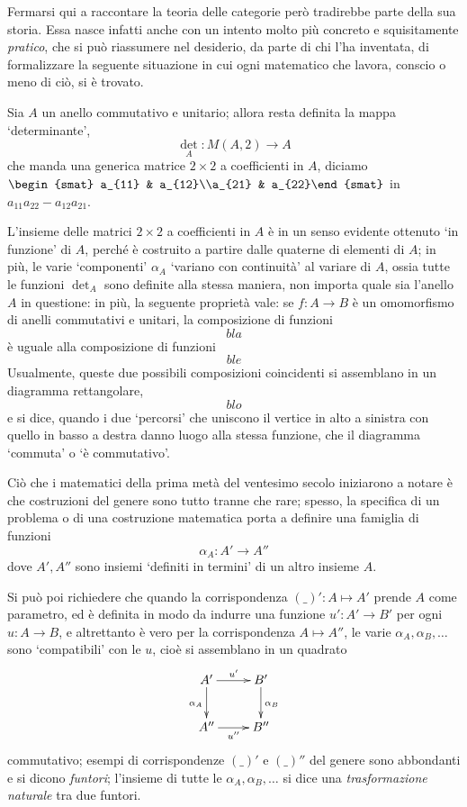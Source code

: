 Fermarsi qui a raccontare la teoria delle categorie però tradirebbe parte della sua storia. Essa nasce infatti anche con un intento molto più concreto e squisitamente \emph{pratico}, che si può riassumere nel desiderio, da parte di chi l'ha inventata, di formalizzare la seguente situazione in cui ogni matematico che lavora, conscio o meno di ciò, si è trovato.
\begin{example}
	Sia \(A\) un anello commutativo e unitario; allora resta definita la mappa `determinante',
	\[\textstyle\det_A : M(A,2) \to A\]
	che manda una generica matrice \(2\times 2\) a coefficienti in \(A\), diciamo \(\begin{smat} a_{11} & a_{12}\\a_{21} & a_{22}\end{smat}\) in \(a_{11}a_{22}-a_{12}a_{21}\).
\end{example}
L'insieme delle matrici $2\times 2$ a coefficienti in $A$ è in un senso evidente ottenuto `in funzione' di $A$, perché è costruito a partire dalle quaterne di elementi di $A$; in più, le varie `componenti' \(\alpha_A\) `variano con continuità' al variare di \(A\), ossia tutte le funzioni \(\det_A\) sono definite alla stessa maniera, non importa quale sia l'anello \(A\) in questione: in più, la seguente proprietà vale: se $f : A\to B$ è un omomorfismo di anelli commutativi e unitari, la composizione di funzioni 
\[bla\]
è uguale alla composizione di funzioni 
\[ble\] 
Usualmente, queste due possibili composizioni coincidenti si assemblano in un diagramma rettangolare,
\[blo\] 
e si dice, quando i due `percorsi' che uniscono il vertice in alto a sinistra con quello in basso a destra danno luogo alla stessa funzione, che il diagramma `commuta' o `è commutativo'. 

Ciò che i matematici della prima metà del ventesimo secolo iniziarono a notare è che costruzioni del genere sono tutto tranne che rare; spesso, la specifica di un problema o di una costruzione matematica porta a definire una famiglia di funzioni
\[\alpha_A : A' \to A'' \]
dove \(A',A''\) sono insiemi `definiti in termini' di un altro insieme \(A\).

Si può poi richiedere che quando la corrispondenza \((\_)' : A\mapsto A'\) prende \(A\) come parametro, ed è definita in modo da indurre una funzione \(u' : A' \to B'\) per ogni \(u : A \to B\), e altrettanto è vero per la corrispondenza \(A\mapsto A''\), le varie \(\alpha_A, \alpha_B,\dots\) sono `compatibili' con le \(u\), cioè si assemblano in un quadrato%
\[
	\vcenter{\xymatrix{
			A'\ar[r]^{u'}\ar[d]_{\alpha_A} & B'\ar[d]^{\alpha_B} \\
			A'' \ar[r]_{u''} & B''
		}}
\]
commutativo; esempi di corrispondenze \((\_)'\) e \((\_)''\) del genere sono abbondanti e si dicono \emph{funtori}; l'insieme di tutte le \(\alpha_A,\alpha_B,\dots\) si dice una \emph{trasformazione naturale} tra due funtori.

